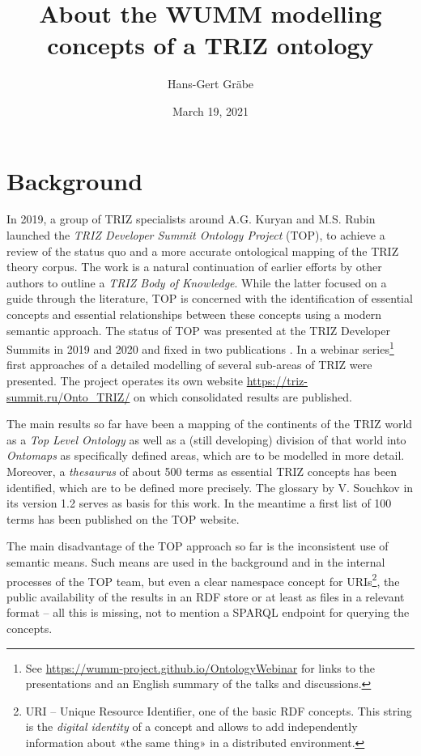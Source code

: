 \documentclass[11pt,a4paper]{article}
\title{About the WUMM modelling concepts of a TRIZ ontology}
\author{Hans-Gert Gr\"abe}
\date{March 19,  2021}
\begin{document}
\maketitle

\section{Background}

In 2019, a group of TRIZ specialists around A.G. Kuryan and M.S. Rubin
launched the \emph{TRIZ Developer Summit Ontology Project} (TOP), to achieve a
review of the status quo and a more accurate ontological mapping of the TRIZ
theory corpus. The work is a natural continuation of earlier efforts by other
authors \cite{TBK2007, TBK2012} to outline a \emph{TRIZ Body of Knowledge}.
While the latter focused on a guide through the literature, TOP is concerned
with the identification of essential concepts and essential relationships
between these concepts using a modern semantic approach. The status of TOP was
presented at the TRIZ Developer Summits in 2019 and 2020 and fixed in two
publications \cite{TOP2019, TOP2020}. In a webinar series\footnote{See
  \url{https://wumm-project.github.io/OntologyWebinar} for links to the
  presentations and an English summary of the talks and discussions.}  first
approaches of a detailed modelling of several sub-areas of TRIZ were
presented.  The project operates its own website
\url{https://triz-summit.ru/Onto_TRIZ/} on which consolidated results are
published.

The main results so far have been a mapping of the continents of the TRIZ
world as a \emph{Top Level Ontology} as well as a (still developing) division
of that world into \emph{Ontomaps} as specifically defined areas, which are to
be modelled in more detail. Moreover, a \emph{thesaurus} of about 500 terms as
essential TRIZ concepts has been identified, which are to be defined more
precisely. The glossary \cite{Souchkov2018} by V. Souchkov in its version 1.2
serves as basis for this work. In the meantime a first list of 100 terms
\cite{TOP-Glossary} has been published on the TOP website.

The main disadvantage of the TOP approach so far is the inconsistent use of
semantic means. Such means are used in the background and in the internal
processes of the TOP team, but even a clear namespace concept for
URIs\footnote{URI -- Unique Resource Identifier, one of the basic RDF
  concepts. This string is the \emph{digital identity} of a concept and allows
  to add independently information about «the same thing» in a distributed
  environment. }, the public availability of the results in an RDF store or at
least as files in a relevant format -- all this is missing, not to mention a
SPARQL endpoint for querying the concepts.
\end{document}
